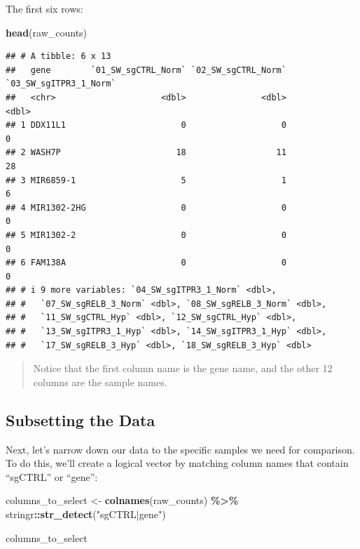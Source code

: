 \documentclass[
]{book}
\newenvironment{Shaded}{\begin{snugshade}}{\end{snugshade}}
\newcommand{\FunctionTok}[1]{\textcolor[rgb]{0.13,0.29,0.53}{\textbf{#1}}}
\newcommand{\NormalTok}[1]{#1}
\newcommand{\OtherTok}[1]{\textcolor[rgb]{0.56,0.35,0.01}{#1}}
\newcommand{\SpecialCharTok}[1]{\textcolor[rgb]{0.81,0.36,0.00}{\textbf{#1}}}
\newcommand{\StringTok}[1]{\textcolor[rgb]{0.31,0.60,0.02}{#1}}
\begin{document}
The first six rows:

\begin{Shaded}
\begin{Highlighting}[]
\FunctionTok{head}\NormalTok{(raw\_counts)}
\end{Highlighting}
\end{Shaded}

\begin{verbatim}
## # A tibble: 6 x 13
##   gene        `01_SW_sgCTRL_Norm` `02_SW_sgCTRL_Norm` `03_SW_sgITPR3_1_Norm`
##   <chr>                     <dbl>               <dbl>                  <dbl>
## 1 DDX11L1                       0                   0                      0
## 2 WASH7P                       18                  11                     28
## 3 MIR6859-1                     5                   1                      6
## 4 MIR1302-2HG                   0                   0                      0
## 5 MIR1302-2                     0                   0                      0
## 6 FAM138A                       0                   0                      0
## # i 9 more variables: `04_SW_sgITPR3_1_Norm` <dbl>,
## #   `07_SW_sgRELB_3_Norm` <dbl>, `08_SW_sgRELB_3_Norm` <dbl>,
## #   `11_SW_sgCTRL_Hyp` <dbl>, `12_SW_sgCTRL_Hyp` <dbl>,
## #   `13_SW_sgITPR3_1_Hyp` <dbl>, `14_SW_sgITPR3_1_Hyp` <dbl>,
## #   `17_SW_sgRELB_3_Hyp` <dbl>, `18_SW_sgRELB_3_Hyp` <dbl>
\end{verbatim}

\begin{quote}
Notice that the first column name is the gene name, and the other 12 columns are the sample names.
\end{quote}

\hypertarget{subsetting-the-data}{%
\subsection{Subsetting the Data}\label{subsetting-the-data}}

Next, let's narrow down our data to the specific samples we need for comparison. To do this, we'll create a logical vector by matching column names that contain ``sgCTRL'' or ``gene'':

\begin{Shaded}
\begin{Highlighting}[]
\NormalTok{columns\_to\_select }\OtherTok{\textless{}{-}} \FunctionTok{colnames}\NormalTok{(raw\_counts) }\SpecialCharTok{\%\textgreater{}\%}
\NormalTok{  stringr}\SpecialCharTok{::}\FunctionTok{str\_detect}\NormalTok{(}\StringTok{"sgCTRL|gene"}\NormalTok{)}

\NormalTok{columns\_to\_select}
\end{Highlighting}
\end{Shaded}
\end{document}
